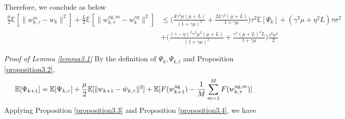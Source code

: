 Therefore, we conclude as below
\begin{align*}
    \frac{\mu}{2}\mathbb{E}[\|w_{k, \tau}^m - w_k\|^2] + \frac{L}{2} \mathbb{E}[\|w_{k, \tau}^{\textrm{ag}, m} - w_k^{\textrm{ag}}\|^2] &\leq \Big( \frac{4\gamma^2\mu(\mu+L)}{(1+\gamma\mu)^2} + \frac{2L\gamma^2(\mu+L)}{1+\gamma\mu}\Big)\tau^2 \mathbb{E}[\Psi_k] + (\gamma^2\mu+\eta^2 L)\tau\sigma^2 \\
    &+ \Big( \frac{(\gamma-\eta)^2\gamma^2\mu^2(\mu+L)}{(1+\gamma\mu)^2} + \frac{\gamma^4(\mu+L)^2 L}{1+\gamma\mu} \Big) \frac{\tau^3\sigma^2}{2}
\end{align*}

\emph{Proof of Lemma \ref{lemma3.1}} \textrm{ } By the definition of $\Psi_k, \Psi_{k, t}$ and Proposition \ref{proposition3.2},
\begin{gather*}
    \mathbb{E}[\Psi_{k+1}] = \mathbb{E}[\Psi_{k, \tau}] + \frac{\mu}{2}\mathbb{E}[\|w_{k+1} - \Bar{w}_{k, \tau}\|^2] + \mathbb{E}[F(w_{k+1}^{\textrm{ag}}) - \frac{1}{M} \sum_{m=1}^M F(w_{k, \tau}^{\textrm{ag}, m})]
\end{gather*}
Applying Proposition \ref{proposition3.3} and Proposition \ref{proposition3.4}, we have

